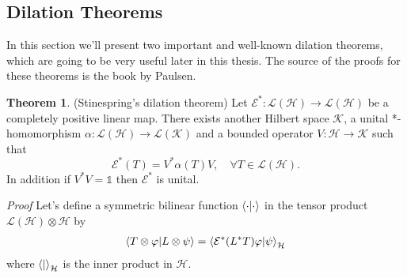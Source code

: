 \documentclass[a4paper,12pt]{wihuri}
\theoremstyle{definition}
\newtheorem{example}{Example}
\newtheorem{theorem}{Theorem}
\numberwithin{definition}{section}
\numberwithin{example}{section}
\numberwithin{theorem}{section}
\numberwithin{proposition}{section}
\numberwithin{lemma}{section}
\newcommand{\hi}{\mathcal{H}}%
\newcommand{\ki}{\mathcal{K}}%
\newcommand{\lin}{\mathcal{L}}%
\newcommand{\EC}{\mathcal{E}}
\newcommand{\A}{\mathsf{A}}%
\newcommand{\B}{\mathsf{B}}%
\newcommand{\id}{\mathds{1}}
\begin{document}

\subsection{Dilation Theorems}
In this section we'll present two important and well-known dilation theorems, which are going to be very useful later in this thesis. The source of the proofs for these theorems is the book by Paulsen\cite{paulsen_vern}.

\begin{theorem}(Stinespring's dilation theorem)
Let $\EC^*: \lin(\hi) \rightarrow \lin(\hi)$ be a completely positive linear map. There exists another Hilbert space $\ki$, a unital *-homomorphism $\alpha : \lin(\hi) \rightarrow \lin(\ki)$ and a bounded operator $V: \hi \rightarrow \ki$ such that
\begin{equation}
\EC^*(T) = V^*\alpha(T)V, \quad \forall T \in \lin(\hi)\text{.}
\end{equation}
In addition if $V^*V = \id$ then $\EC^*$ is unital.
\end{theorem}
\noindent \textit{Proof} Let's define a symmetric bilinear function $\braket{\cdot|\cdot}$ in the tensor product $\lin(\hi) \otimes \hi$ by
\begin{align*}
\braket{T\otimes \varphi|L \otimes \psi} = \braket{\EC^*(L^*T)\varphi|\psi}_{\hi} 
\end{align*}
where $\braket{|}_{\hi}$ is the inner product in $\hi$. 
\end{document}
